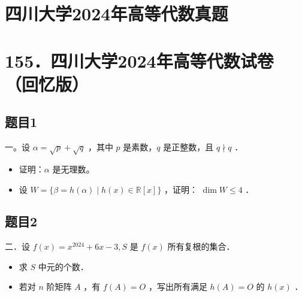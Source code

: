 \documentclass{article}
\begin{document}
\section*{四川大学2024年高等代数真题}
\section*{155．四川大学2024年高等代数试卷（回忆版）}

\subsection{题目1}
一。设 \(\alpha=\sqrt{p}+\sqrt{q}\) ，其中 \(p\) 是素数，\(q\) 是正整数，且 \(q \nmid q\) ．

\begin{itemize}
  \item[（1）] 证明：\(\alpha\) 是无理数。
  \item[（2）] 设 \(W=\{\beta=h(\alpha) \mid h(x) \in \mathbb{R}[x]\}\) ，证明： \(\operatorname{dim} W \leq 4\) ．
\end{itemize}

\subsection{题目2}
二．设 \(f(x)=x^{2024}+6 x-3, S\) 是 \(f(x)\) 所有复根的集合．

\begin{itemize}
  \item[（1）] 求 \(S\) 中元的个数．
  \item[（2）] 若对 \(n\) 阶矩阵 \(A\) ，有 \(f(A)=O\) ，写出所有满足 \(h(A)=O\) 的 \(h(x)\) ．
\end{itemize}
\end{document}
